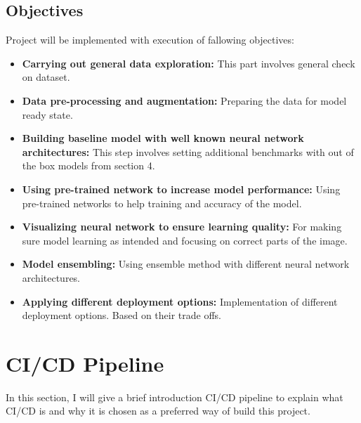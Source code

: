 \subsection{Objectives}
Project will be implemented with execution of fallowing objectives:
\begin{itemize}
    \item \textbf{Carrying out general data exploration: }This part involves general check on dataset.
    \item \textbf{Data pre-processing and augmentation: }Preparing the data for model ready state.
    \item \textbf{Building baseline model with well known neural network architectures: }This step involves setting additional benchmarks with out of the box models from section 4.
    \item \textbf{Using pre-trained network to increase model performance: }Using pre-trained networks to help training and accuracy of the model.
    \item \textbf{Visualizing neural network to ensure learning quality: } For making sure model learning as intended and focusing on correct parts of the image.
    \item \textbf{Model ensembling: }Using ensemble method with different neural network architectures.
    \item \textbf{Applying different deployment options: } Implementation of different deployment options. Based on their trade offs. 
\end{itemize}

\section{CI/CD Pipeline}
In this section, I will give a brief introduction CI/CD pipeline to explain what CI/CD is and why it is chosen as a preferred way of build this project.

